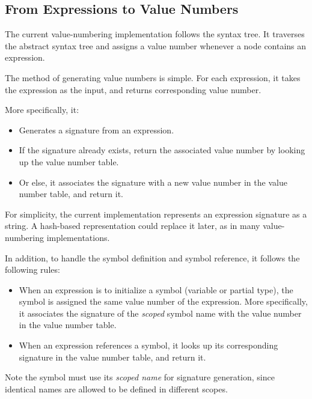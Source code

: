 \subsection*{From Expressions to Value Numbers}

The current value-numbering implementation follows the syntax tree. It traverses the abstract syntax tree and assigns a value number whenever a node contains an expression.

The method of generating value numbers is simple. For each expression, it takes the expression as the input, and returns corresponding value number.

More specifically, it:

\begin{itemize}[leftmargin=1.6em]
\item Generates a signature from an expression.
\item If the signature already exists, return the associated value number by looking up the value number table.
\item Or else, it associates the signature with a new value number in the value number table, and return it.
\end{itemize}

For simplicity, the current implementation represents an expression signature as a string. A hash-based representation could replace it later, as in many value-numbering implementations.

In addition, to handle the symbol definition and symbol reference, it follows the following rules:

\begin{itemize}[leftmargin=1.6em]
\item When an expression is to initialize a symbol (variable or partial type), the symbol is assigned the same value number of the expression. More specifically, it associates the signature of the \emph{scoped} symbol name with the value number in the value number table.
\item When an expression references a symbol, it looks up its corresponding signature in the value number table, and return it.
\end{itemize}

Note the symbol must use its \emph{scoped name} for signature generation, since identical names are allowed to be defined in different scopes.
